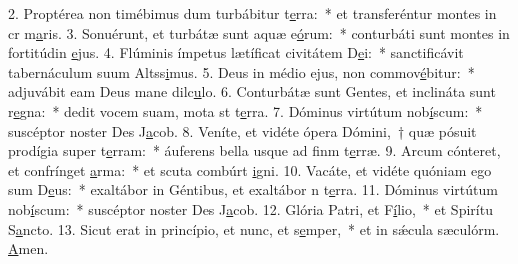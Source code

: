 2. Proptérea non timébimus dum turbábitur t\uline{e}rra:~* et transferéntur montes in cr m\uline{a}ris.
3. Sonuérunt, et turbátæ sunt aquæ e\uline{ó}rum:~* conturbáti sunt montes in fortitúdin \uline{e}jus.
4. Flúminis ímpetus lætíficat civitátem D\uline{e}i:~* sanctificávit tabernáculum suum Altss\uline{i}mus.
5. Deus in médio ejus, non commov\uline{é}bitur:~* adjuvábit eam Deus mane dilc\uline{u}lo.
6. Conturbátæ sunt Gentes, et inclináta sunt r\uline{e}gna:~* dedit vocem suam, mota st t\uline{e}rra.
7. Dóminus virtútum nob\uline{í}scum:~* suscéptor noster Des J\uline{a}cob.
8. Veníte, et vidéte ópera Dómini,~† quæ pósuit prodígia super t\uline{e}rram:~* áuferens bella usque ad finm t\uline{e}rræ.
9. Arcum cónteret, et confrínget \uline{a}rma:~* et scuta combúrt \uline{i}gni.
10. Vacáte, et vidéte quóniam ego sum D\uline{e}us:~* exaltábor in Géntibus, et exaltábor n t\uline{e}rra.
11. Dóminus virtútum nob\uline{í}scum:~* suscéptor noster Des J\uline{a}cob.
12. Glória Patri, et F\uline{í}lio,~* et Spirítu S\uline{a}ncto.
13. Sicut erat in princípio, et nunc, et s\uline{e}mper,~* et in sǽcula sæculórm. \uline{A}men.
